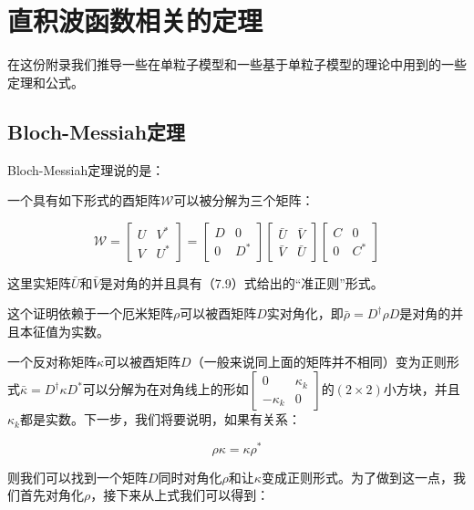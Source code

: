 
\chapter{直积波函数相关的定理\label{chap:=0076F4=0079EF=006CE2=0051FD=006570=0076F8=005173=007684=005B9A=007406}}

在这份附录我们推导一些在单粒子模型和一些基于单粒子模型的理论中用到的一些定理和公式。

\section{Bloch-Messiah定理\cite{BM62}}

Bloch-Messiah定理说的是：

一个具有如下形式的酉矩阵$\mathcal{W}$可以被分解为三个矩阵：

\[
\mathcal{W}=\begin{bmatrix}U & V^{*}\\
V & U^{*}
\end{bmatrix}=\begin{bmatrix}D & 0\\
0 & D^{*}
\end{bmatrix}\begin{bmatrix}\bar{U} & \bar{V}\\
\bar{V} & \bar{U}
\end{bmatrix}\begin{bmatrix}C & 0\\
0 & C^{*}
\end{bmatrix}
\]

这里实矩阵$\bar{U}$和$\bar{V}$是对角的并且具有（7.9）式给出的“准正则”形式。

这个证明依赖于一个厄米矩阵$\rho$可以被酉矩阵$D$实对角化，即$\bar{\rho}=D^{\dagger}\rho D$是对角的并且本征值为实数。

一个反对称矩阵$\kappa$可以被酉矩阵$D$（一般来说同上面的矩阵并不相同）变为正则形式$\bar{\kappa}=D^{\dagger}\kappa D^{*}$可以分解为在对角线上的形如$\left[\begin{smallmatrix}0 & \kappa_{k}\\
-\kappa_{k} & 0
\end{smallmatrix}\right]$的$(2\times2)$小方块，并且$\kappa_{k}$都是实数\cite{Zu62}。下一步，我们将要说明，如果有关系：

\[
\rho\kappa=\kappa\rho^{*}
\]

则我们可以找到一个矩阵$D$同时对角化$\rho$和让$\kappa$变成正则形式。为了做到这一点，我们首先对角化$\rho$，接下来从上式我们可以得到：

